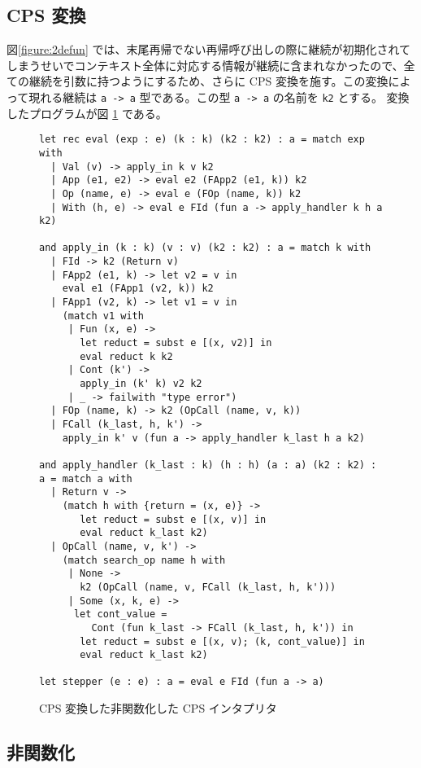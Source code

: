 \subsection{CPS 変換}
\label{subsection:3cps}

図\ref{figure:2defun} では、末尾再帰でない再帰呼び出しの際に継続が初期化されてしまうせいでコンテキスト全体に対応する情報が継続に含まれなかったので、全ての継続を引数に持つようにするため、さらに CPS 変換を施す。この変換によって現れる継続は \texttt{a -> a} 型である。この型 \texttt{a -> a} の名前を \texttt{k2} とする。
変換したプログラムが図 \ref{figure:3cps} である。

\begin{figure}
\begin{verbatim}
let rec eval (exp : e) (k : k) (k2 : k2) : a = match exp with
  | Val (v) -> apply_in k v k2
  | App (e1, e2) -> eval e2 (FApp2 (e1, k)) k2
  | Op (name, e) -> eval e (FOp (name, k)) k2
  | With (h, e) -> eval e FId (fun a -> apply_handler k h a k2)

and apply_in (k : k) (v : v) (k2 : k2) : a = match k with
  | FId -> k2 (Return v)
  | FApp2 (e1, k) -> let v2 = v in
    eval e1 (FApp1 (v2, k)) k2
  | FApp1 (v2, k) -> let v1 = v in
    (match v1 with
     | Fun (x, e) ->
       let reduct = subst e [(x, v2)] in
       eval reduct k k2
     | Cont (k') ->
       apply_in (k' k) v2 k2
     | _ -> failwith "type error")
  | FOp (name, k) -> k2 (OpCall (name, v, k))
  | FCall (k_last, h, k') ->
    apply_in k' v (fun a -> apply_handler k_last h a k2)

and apply_handler (k_last : k) (h : h) (a : a) (k2 : k2) : a = match a with
  | Return v ->
    (match h with {return = (x, e)} ->
       let reduct = subst e [(x, v)] in
       eval reduct k_last k2)
  | OpCall (name, v, k') ->
    (match search_op name h with
     | None ->
       k2 (OpCall (name, v, FCall (k_last, h, k')))
     | Some (x, k, e) ->
      let cont_value =
         Cont (fun k_last -> FCall (k_last, h, k')) in
       let reduct = subst e [(x, v); (k, cont_value)] in
       eval reduct k_last k2)

let stepper (e : e) : a = eval e FId (fun a -> a)
\end{verbatim}
\caption{CPS 変換した非関数化した CPS インタプリタ}
\label{figure:3cps}
\end{figure}

\subsection{非関数化}
\label{subsection:4defun}


